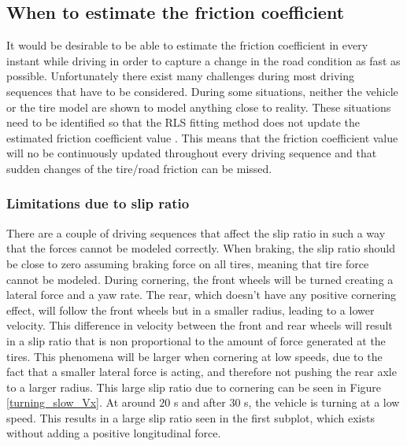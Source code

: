 \subsection{When to estimate the friction coefficient}
\label{when_to_estimate}
It would be desirable to be able to estimate the friction coefficient in every instant while driving in order to capture a change in the road condition as fast as possible. Unfortunately there exist many challenges during most driving sequences that have to be considered. During some situations, neither the vehicle or the tire model are shown to model anything close to reality. These situations need to be identified so that the RLS fitting method does not update the estimated friction coefficient value . This means that the friction coefficient value will no be continuously updated throughout every driving sequence and that sudden changes of the tire/road friction can be missed.

\subsubsection{Limitations due to slip ratio }
There are a couple of driving sequences that affect the slip ratio in such a way that the forces cannot be modeled correctly. When braking, the slip ratio should be close to zero assuming braking force on all tires, meaning that tire force cannot be modeled. During cornering, the front wheels will be turned creating a lateral force and a yaw rate. The rear, which doesn't have any positive cornering effect, will follow the front wheels but in a smaller radius, leading to a lower velocity. This difference in velocity between the front and rear wheels will result in a slip ratio that is non proportional to the amount of force generated at the tires. This phenomena will be larger when cornering at low speeds, due to the fact that a smaller lateral force is acting, and therefore not pushing the rear axle to a larger radius. This large slip ratio due to cornering can be seen in Figure \ref{turning_slow_Vx}. At around $ 20 $ s and after $ 30 $ s, the vehicle is turning at a low speed. This results in a large slip ratio seen in the first subplot, which exists without adding a positive longitudinal force.

